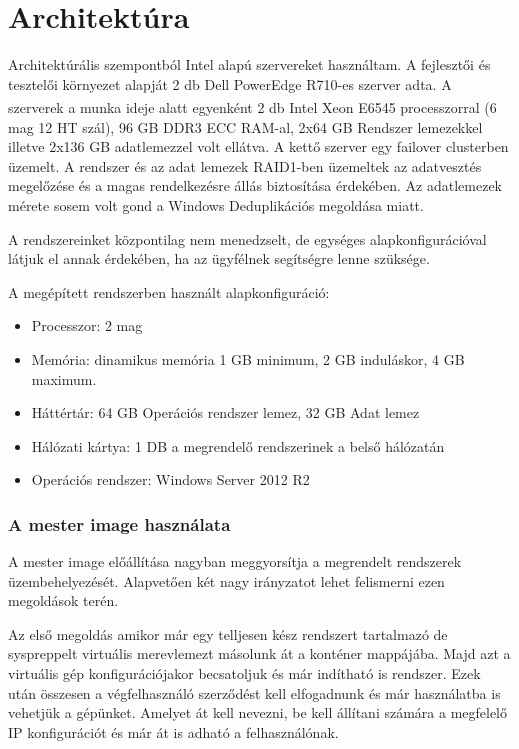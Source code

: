 \documentclass[12pt,oneside,justify]{book}
\begin{document}
\section{Architektúra}

Architektúrális szempontból Intel alapú szervereket használtam. A fejlesztői és tesztelői környezet alapját 2 db Dell PowerEdge R710-es szerver adta. A szerverek a munka ideje alatt egyenként 2 db Intel{\textsuperscript{\textregistered}} Xeon{\textsuperscript{\textregistered}} E6545 processzorral (6 mag 12 HT szál), 96 GB DDR3 ECC RAM-al, 2x64 GB Rendszer lemezekkel illetve 2x136 GB adatlemezzel volt ellátva. A kettő szerver egy failover clusterben üzemelt. A rendszer és az adat lemezek RAID1-ben üzemeltek az adatvesztés megelőzése és a magas rendelkezésre állás biztosítása érdekében. Az adatlemezek mérete sosem volt gond a Windows Deduplikációs megoldása miatt.


A rendszereinket központilag nem menedzselt, de egységes alapkonfigurációval látjuk el annak érdekében, ha az ügyfélnek segítségre lenne szüksége. 


A megépített rendszerben használt alapkonfiguráció:
\begin{itemize}
	\item Processzor: 2 mag
	\item Memória: dinamikus memória 1 GB minimum, 2 GB induláskor, 4 GB maximum.
	\item Háttértár: 64 GB Operációs rendszer lemez, 32 GB Adat lemez
	\item Hálózati kártya: 1 DB a megrendelő rendszerinek a belső hálózatán
	\item Operációs rendszer: Windows Server 2012 R2
\end{itemize}

\subsubsection{A mester image használata}

A mester image előállítása nagyban meggyorsítja a megrendelt rendszerek üzembehelyezését. Alapvetően két nagy irányzatot lehet felismerni ezen megoldások terén. 

Az első megoldás amikor már egy telljesen kész rendszert tartalmazó de syspreppelt virtuális merevlemezt másolunk át a konténer mappájába. Majd azt a virtuális gép konfigurációjakor becsatoljuk és már indítható is rendszer. Ezek után összesen a végfelhasználó szerződést kell elfogadnunk és már használatba is vehetjük a gépünket. Amelyet át kell nevezni, be kell állítani számára a megfelelő IP konfigurációt és már át is adható a felhasználónak. 
\end{document}
